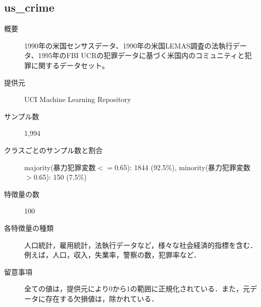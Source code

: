 \subsection{us\_crime}
\begin{description}
    \item[概要] 1990年の米国センサスデータ、1990年の米国LEMAS調査の法執行データ、1995年のFBI UCRの犯罪データに基づく米国内のコミュニティと犯罪に関するデータセット。\cite{uscrime}
    \item[提供元] UCI Machine Learning Repository
    \item[サンプル数] 1,994
    \item[クラスごとのサンプル数と割合] majority(暴力犯罪変数$<=$0.65): 1844 (92.5\%), minority(暴力犯罪変数$>$0.65): 150 (7.5\%) 

    \item[特徴量の数] 100
    \item[各特徴量の種類] \mbox{}
        人口統計，雇用統計，法執行データなど，様々な社会経済的指標を含む．例えば，人口，収入，失業率，警察の数，犯罪率など．
    \item[留意事項] 全ての値は，提供元により0から1の範囲に正規化されている．また，元データに存在する欠損値は，除かれている．
\end{description}

